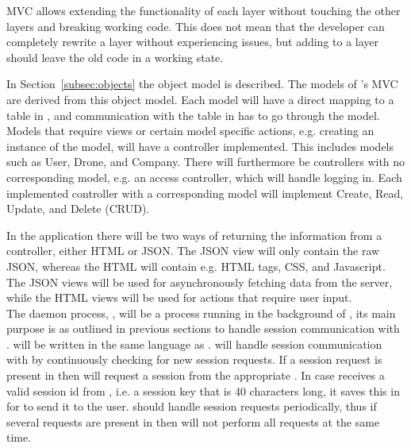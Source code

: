 
MVC allows extending the functionality of each layer without touching the other layers and breaking working code.
This does not mean that the developer can completely rewrite a layer without experiencing issues, but adding to a layer should leave the old code in a working state.

In Section~\ref{subsec:objects} the object model is described.
The models of 's MVC are derived from this object model.
Each model will have a direct mapping to a table in , and communication with the table in  has to go through the model. \\

Models that require views or certain model specific actions, e.g. creating an instance of the model, will have a controller implemented.
This includes models such as User, Drone, and Company.
There will furthermore be controllers with no corresponding model, e.g. an access controller, which will handle logging in.
Each implemented controller with a corresponding model will implement Create, Read, Update, and Delete (CRUD). \\

In the application there will be two ways of returning the information from a controller, either HTML or JSON.
The JSON view will only contain the raw JSON, whereas the HTML will contain e.g. HTML tags, CSS, and Javascript.
The JSON views will be used for asynchronously fetching data from the server, while the HTML views will be used for actions that require user input. \\

The daemon process, , will be a process running in the background of , its main purpose is as outlined in previous sections to handle session communication with .
 will be written in the same language as . %
 will handle session communication with  by continuously checking  for new session requests.
If a session request is present in  then  will request a session from the appropriate .
In case  receives a valid session id from , i.e. a session key that is 40 characters long, it saves this in  for  to send it to the user.
 should handle session requests periodically, thus if several requests are present in  then  will not perform all requests at the same time. \\

